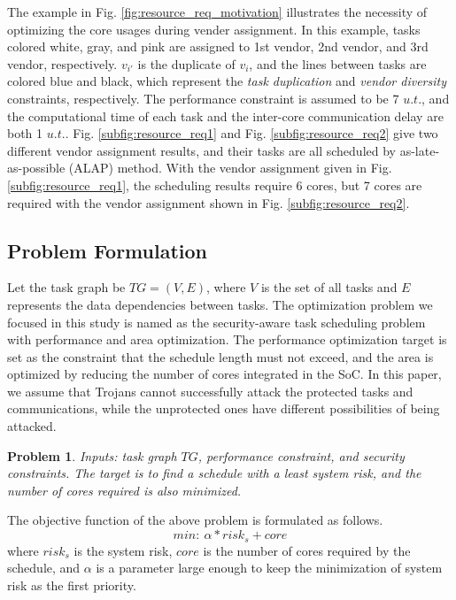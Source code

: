 \documentclass[10pt,journal]{IEEEtran}
\newtheorem{problem}{\textbf{Problem}}
\begin{document}
The example in Fig. \ref{fig:resource_req_motivation} illustrates the necessity of optimizing the core usages during vender assignment. In this example, tasks colored white, gray, and pink are assigned to 1st vendor, 2nd vendor, and 3rd vendor, respectively. $v_{i'}$ is the duplicate of $v_i$, and the lines between tasks are colored blue and black, which represent the \textit{task duplication} and \textit{vendor diversity} constraints, respectively. The performance constraint is assumed to be 7 $u.t.$, and the computational time of each task and the inter-core communication delay are both 1 $u.t.$. Fig. \ref{subfig:resource_req1} and Fig. \ref{subfig:resource_req2} give two different vendor assignment results, and their tasks are all scheduled by as-late-as-possible (ALAP) method. With the vendor assignment given in Fig. \ref{subfig:resource_req1}, the scheduling results require 6 cores, but 7 cores are required with the vendor assignment shown in Fig. \ref{subfig:resource_req2}.

\subsection{Problem Formulation}

Let the task graph be $TG=(V,E)$, where $V$ is the set of all tasks and $E$ represents the data dependencies between tasks. The optimization problem we focused in this study is named as the security-aware task scheduling problem with performance and area optimization. The performance optimization target is set as the constraint that the schedule length must not exceed, and the area is optimized by reducing the number of cores integrated in the SoC. In this paper, we assume that Trojans cannot successfully attack the protected tasks and communications, while the unprotected ones have different possibilities of being attacked.

\begin{problem}
Inputs: task graph $TG$, performance constraint, and security constraints. The target is to find a schedule with a least system risk, and the number of cores required is also minimized.
\end{problem}

The objective function of the above problem is formulated as follows.
\begin{equation}
min:~\alpha*risk_s+core
\end{equation}
\noindent where $risk_s$ is the system risk, $core$ is the number of cores required by the schedule, and $\alpha$ is a parameter large enough to keep the minimization of system risk as the first priority.
\end{document}
